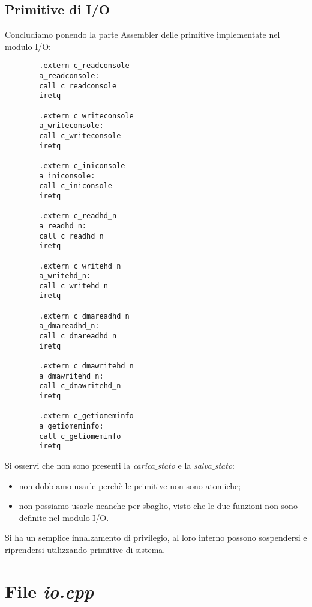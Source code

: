 \subsection{Primitive di I/O}
Concludiamo ponendo la parte Assembler delle primitive implementate nel modulo I/O:
\begin{multicols}{2}
	\small
	\begin{verbatim}
		.extern c_readconsole
		a_readconsole:
		call c_readconsole
		iretq
		
		.extern c_writeconsole
		a_writeconsole:
		call c_writeconsole
		iretq
		
		.extern c_iniconsole
		a_iniconsole:
		call c_iniconsole
		iretq
		
		.extern	c_readhd_n
		a_readhd_n:
		call c_readhd_n
		iretq
		
		.extern	c_writehd_n
		a_writehd_n:
		call c_writehd_n
		iretq
		
		.extern	c_dmareadhd_n
		a_dmareadhd_n:
		call c_dmareadhd_n
		iretq
		
		.extern	c_dmawritehd_n
		a_dmawritehd_n:
		call c_dmawritehd_n
		iretq
		
		.extern	c_getiomeminfo
		a_getiomeminfo:
		call c_getiomeminfo
		iretq
	\end{verbatim}
	\normalsize 
\end{multicols}
\noindent Si osservi che non sono presenti la \emph{carica$\_$stato} e la \emph{salva$\_$stato}: 
\begin{itemize}
	\item non dobbiamo usarle perchè le primitive non sono atomiche;
	\item non possiamo usarle neanche per sbaglio, visto che le due funzioni non sono definite nel modulo I/O.
\end{itemize}
Si ha un semplice innalzamento di privilegio, al loro interno possono sospendersi e riprendersi utilizzando primitive di sistema.

\section{File \emph{io.cpp}}
